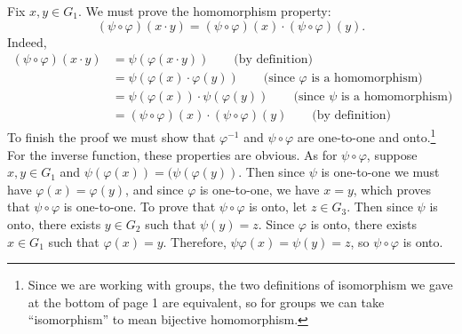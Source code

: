 \documentclass[12pt,reqno]{amsart}
\newcommand{\<}{\ensuremath{\langle}}
\renewcommand{\>}{\ensuremath{\rangle}}
\renewcommand{\phi}{\ensuremath{\varphi}}
\begin{document}
\begin{enumerate}[{\bf 1.}]
Fix $x, y \in G_1$. We must prove the homomorphism property:
\begin{equation}
  \label{eq:2}
(\psi\circ \phi)(x\cdot y) =(\psi\circ \phi)(x)\cdot (\psi\circ \phi)(y).
\end{equation}
Indeed,
\begin{align*}
(\psi\circ \phi)(x\cdot y) &=\psi(\phi(x\cdot y)) \qquad \text{(by definition)}\\
&=\psi(\phi(x)\cdot \phi(y)) \qquad \text{(since $\phi$ is a homomorphism)}\\
&=\psi(\phi(x))\cdot \psi(\phi(y)) \qquad \text{(since $\psi$ is a homomorphism)}\\
&=(\psi\circ \phi)(x) \cdot (\psi\circ \phi)(y) \qquad \text{(by definition)}
\end{align*}
To finish the proof we must
show that $\phi^{-1}$ and $\psi\circ \phi$ 
are one-to-one and onto.\footnote{Since we are working with groups, the two
  definitions of isomorphism we gave at the bottom of page 1 are
  equivalent, so for groups we can take ``isomorphism'' to mean bijective
  homomorphism.} 
For the inverse function, these properties are obvious.  
As for $\psi \circ \phi$, suppose $x, y\in G_1$ and 
 $\psi(\phi (x)) =  (\psi(\phi(y))$. Then since $\psi$ is one-to-one we must
have $\phi(x)=\phi(y)$, and since $\phi$ is one-to-one, we have $x=y$, which
proves that $\psi\circ\phi$ is one-to-one.
To prove that $\psi\circ\phi$ is onto, let $z \in G_3$.  
Then since $\psi$ is onto, there exists $y\in G_2$ such that $\psi(y) = z$.
Since $\phi$ is onto, there exists $x\in G_1$ such that $\phi(x) = y$.
Therefore, $\psi\phi(x) = \psi(y) = z$, so 
$\psi\circ\phi$ is onto.

\end{enumerate}
\end{document}
